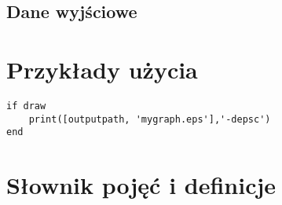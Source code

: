 \documentclass[10pt]{minutes}
\begin{document}
  \subsection{Dane wyjściowe}

\section{Przykłady użycia}
\begin{lstlisting}
if draw
    print([outputpath, 'mygraph.eps'],'-depsc')
end
\end{lstlisting}
\section{Słownik pojęć i definicje}
\end{document}
